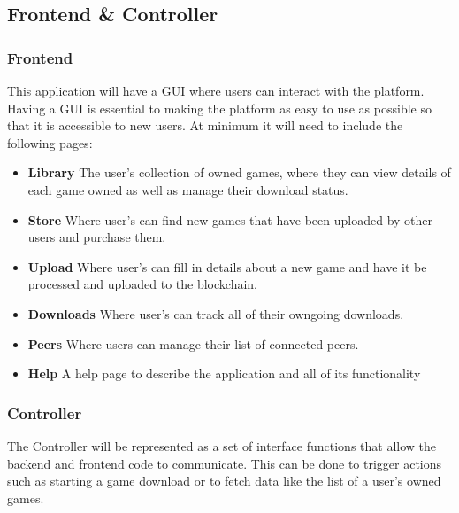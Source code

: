 \subsection{Frontend \& Controller}

\subsubsection{Frontend}\label{subsubsec:frontend}

This application will have a GUI   where users can interact with the platform. Having a GUI is essential to making the platform as easy to use as possible so that it is accessible to new users. At minimum it will need to include the following pages:

\begin{itemize}
  \item \textbf{Library} The user's collection of owned games, where they can view details of each game owned as well as manage their download status.
  \item \textbf{Store} Where user's can find new games that have been uploaded by other users and purchase them.
  \item \textbf{Upload} Where user's can fill in details about a new game and have it be processed and uploaded to the blockchain.
  \item \textbf{Downloads} Where user's can track all of their owngoing downloads.
  \item \textbf{Peers} Where users can manage their list of connected peers.
  \item \textbf{Help} A help page to describe the application and all of its functionality 
\end{itemize}


\subsubsection{Controller}

The Controller will be represented as a set of interface functions that allow the backend and frontend code to communicate. This can be done to trigger actions such as starting a game download or to fetch data like the list of a user's owned games.
